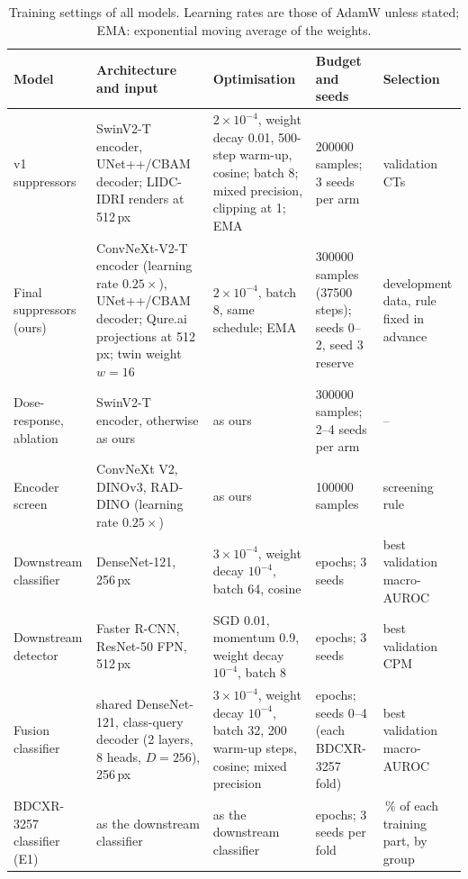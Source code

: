 \begin{table}[!t]
\centering
\caption{Training settings of all models. Learning rates are those of AdamW unless stated; EMA: exponential moving average of the
weights.}
\label{tab:settings}
\footnotesize
\renewcommand{\arraystretch}{1.08}
\setlength{\tabcolsep}{3pt}
\begin{tabularx}{\textwidth}{@{}>{\raggedright\arraybackslash}p{2.6cm}>{\raggedright\arraybackslash}X%
>{\raggedright\arraybackslash}p{4.4cm}>{\raggedright\arraybackslash}p{2.5cm}>{\raggedright\arraybackslash}p{2.7cm}@{}}
\toprule
Model & Architecture and input & Optimisation & Budget and seeds & Selection \\
\midrule
v1 suppressors & SwinV2-T encoder, UNet++/CBAM decoder; LIDC-IDRI renders at 512\,px & $2\times10^{-4}$, weight decay 0.01, 500-step
 warm-up, cosine; batch 8; mixed precision, clipping at 1; EMA & \num{200000} samples; 3 seeds per arm & validation CTs \\
Final suppressors (ours) & ConvNeXt-V2-T encoder (learning rate $0.25\times$), UNet++/CBAM decoder; Qure.ai projections at 512\,px; twin
 weight $w=16$ & $2\times10^{-4}$, batch 8, same schedule; EMA & \num{300000} samples (\num{37500} steps); seeds 0--2, seed 3 reserve &
 development data, rule fixed in advance \\
Dose-response, ablation & SwinV2-T encoder, otherwise as ours & as ours & \num{300000} samples; 2--4 seeds per arm & -- \\
Encoder screen & ConvNeXt V2, DINOv3, RAD-DINO (learning rate $0.25\times$) & as ours & \num{100000} samples & screening rule \\
Downstream classifier & DenseNet-121, 256\,px & $3\times10^{-4}$, weight decay $10^{-4}$, batch 64, cosine & 10 epochs; 3 seeds & best
 validation macro-AUROC \\
Downstream detector & Faster R-CNN, ResNet-50 FPN, 512\,px & SGD 0.01, momentum 0.9, weight decay $10^{-4}$, batch 8 & 12 epochs; 3
 seeds & best validation CPM \\
Fusion classifier & shared DenseNet-121, class-query decoder (2 layers, 8 heads, $D=256$), 256\,px & $3\times10^{-4}$, weight decay
 $10^{-4}$, batch 32, 200 warm-up steps, cosine; mixed precision & 20 epochs; seeds 0--4 (each BDCXR-3257 fold) & best validation
 macro-AUROC \\
BDCXR-3257 classifier (E1) & as the downstream classifier & as the downstream classifier & 10 epochs; 3 seeds per fold & 10\,\% of each
 training part, by group \\
\bottomrule
\end{tabularx}
\end{table}

